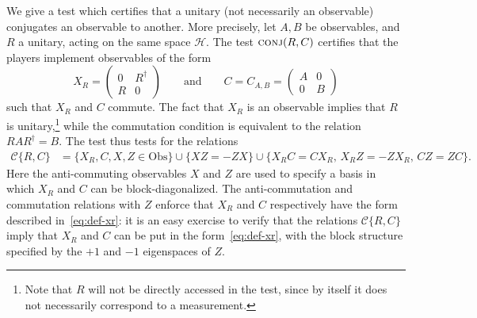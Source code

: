 \documentclass[11pt]{article}
\theoremstyle{remark}
\theoremstyle{definition}
\newcommand{\mH}{\mathcal{H}}
\newcommand{\setft}[1]{\mathrm{#1}}
\newcommand{\Obs}{\setft{Obs}}
\newcommand{\conj}{\textsc{conj}}
\begin{document}
We give a test which certifies that a unitary (not necessarily an observable) conjugates an observable to another. More precisely, let $A,B$ be observables, and $R$ a unitary, acting on the same space $\mH$. The test $\conj(R,C)$ certifies that the players implement observables of the form
\begin{equation}\label{eq:def-xr}
X_R = \begin{pmatrix} 0 & R^\dagger\\ R & 0 \end{pmatrix}\qquad \text{and}\qquad C = C_{A,B} = \begin{pmatrix} A & 0\\ 0 & B \end{pmatrix}
\end{equation}
such that $X_R$ and $C$ commute. The fact that $X_R$ is an observable implies that $R$ is unitary,\footnote{Note that $R$ will not be directly accessed in the test, since by itself it does not necessarily correspond to a measurement.} while the commutation condition is equivalent to the relation $RAR^\dagger = B$. The test thus tests for the relations
\begin{align*}
 \mathcal{C}\{R,C\} &= \big\{ X_R,C,X,Z\in \Obs\big\} \cup \big\{XZ=-ZX\big\}
\cup \big\{ X_R C = C X_R,\, X_RZ=-Z X_R,\, C Z=ZC\big\}.
\end{align*}
Here the anti-commuting observables $X$ and $Z$ are used to specify a basis in which $X_R$ and $C$ can be block-diagonalized. The anti-commutation and commutation relations with $Z$ enforce that $X_R$ and $C$ respectively have the form described in~\eqref{eq:def-xr}: it is an easy exercise to verify that the relations $\mathcal{C}\{R,C\}$ imply that $X_R$ and $C$ can be put in the form~\eqref{eq:def-xr}, with the block structure specified by the $+1$ and $-1$ eigenspaces of $Z$.
\end{document}
